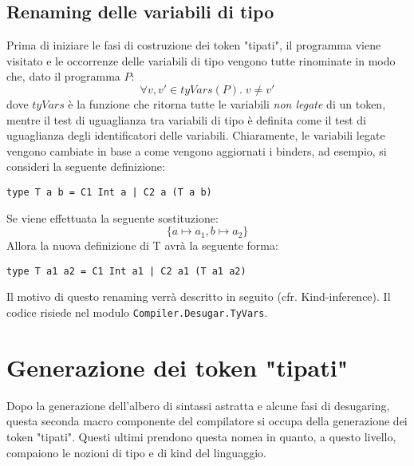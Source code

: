 \documentclass[10pt,a4paper]{article}
\begin{document}
\subsection{Renaming delle variabili di tipo}
Prima di iniziare le fasi di costruzione dei token "tipati", il programma viene visitato e le occorrenze delle variabili
di tipo vengono tutte rinominate in modo che, dato il programma $ P $:
\[ \forall v, v' \in tyVars(P). \; v \neq v' \]
dove $ tyVars $ è la funzione che ritorna tutte le variabili \textit{non legate} di un token, mentre il test di uguaglianza
tra variabili di tipo è definita come il test di uguaglianza degli identificatori delle variabili.
Chiaramente, le variabili legate vengono cambiate in base a come vengono aggiornati i binders, ad esempio, si consideri
la seguente definizione:
\begin{lstlisting}
type T a b = C1 Int a | C2 a (T a b)
\end{lstlisting}
Se viene effettuata la seguente sostituzione:
\[ \{ a \mapsto a_1, b \mapsto a_2 \} \]
Allora la nuova definizione di T avrà la seguente forma:
\begin{lstlisting}
type T a1 a2 = C1 Int a1 | C2 a1 (T a1 a2)
\end{lstlisting}
Il motivo di questo renaming verrà descritto in seguito (cfr. Kind-inference). Il codice risiede nel modulo
\texttt{Compiler.Desugar.TyVars}.

\section{Generazione dei token "tipati"}
Dopo la generazione dell'albero di sintassi astratta e alcune fasi di desugaring, questa seconda macro componente del
compilatore si occupa della generazione dei token "tipati". Questi ultimi prendono questa nomea in quanto, a questo
livello, compaiono le nozioni di tipo e di kind del linguaggio.
\end{document}
